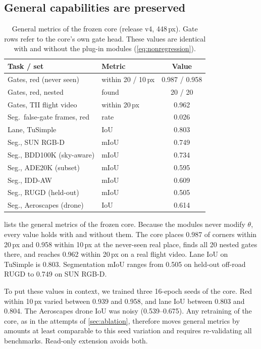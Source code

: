 \documentclass[10pt,twocolumn,letterpaper]{article}
\begin{document}
\subsection{General capabilities are preserved}
\label{sec:general}
\begin{table}[t]
  \centering
  \small
  \begin{tabular}{@{}llc@{}}
    \toprule
    Task / set & Metric & Value \\
    \midrule
    Gates, red (never seen) & within 20 / 10\,px & 0.987 / 0.958 \\
    Gates, red, nested & found & 20 / 20 \\
    Gates, TII flight video & within 20\,px & 0.962 \\
    Seg.\ false-gate frames, red & rate & 0.026 \\
    Lane, TuSimple & IoU & 0.803 \\
    Seg., SUN RGB-D & mIoU & 0.749 \\
    Seg., BDD100K (sky-aware) & mIoU & 0.734 \\
    Seg., ADE20K (subset) & mIoU & 0.595 \\
    Seg., IDD-AW & mIoU & 0.609 \\
    Seg., RUGD (held-out) & mIoU & 0.505 \\
    Seg., Aeroscapes (drone) & IoU & 0.614 \\
    \bottomrule
  \end{tabular}
  \caption{General metrics of the frozen core (release v4, 448\,px). Gate rows refer to the core's own gate head. These values are identical with and without the plug-in modules (\cref{eq:nonregression}).}
  \label{tab:general}
\end{table}

 lists the general metrics of the frozen core. Because the modules never modify $\theta$, every value holds with and without them. The core places 0.987 of corners within 20\,px and 0.958 within 10\,px at the never-seen real place, finds all 20 nested gates there, and reaches 0.962 within 20\,px on a real flight video. Lane IoU on TuSimple is 0.803. Segmentation mIoU ranges from 0.505 on held-out off-road RUGD to 0.749 on SUN RGB-D.

To put these values in context, we trained three 16-epoch seeds of the core. Red within 10\,px varied between 0.939 and 0.958, and lane IoU between 0.803 and 0.804. The Aeroscapes drone IoU was noisy (0.539--0.675). Any retraining of the core, as in the attempts of \cref{sec:ablation}, therefore moves general metrics by amounts at least comparable to this seed variation and requires re-validating all benchmarks. Read-only extension avoids both.
\end{document}
